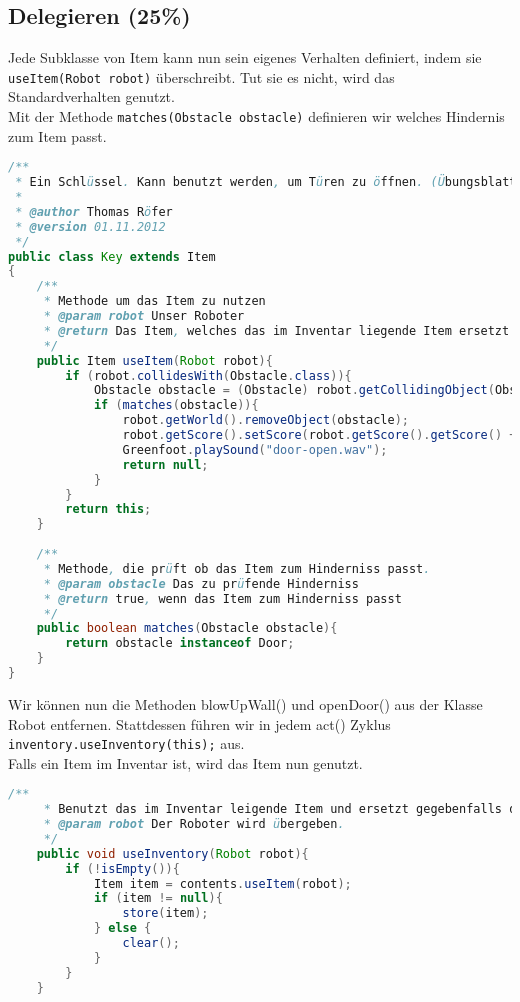 \documentclass{pi1}
\begin{document}
\subsection{Delegieren (25\%)}

Jede Subklasse von Item kann nun sein eigenes Verhalten definiert, indem sie \texttt{useItem(Robot robot)} überschreibt. Tut sie es nicht, wird das Standardverhalten genutzt.\\
Mit der Methode \texttt{matches(Obstacle obstacle)} definieren wir welches Hindernis zum Item passt.

\begin{lstlisting}[caption={Klasse \emph{Key}}, firstnumber=1, language=Java]
/**
 * Ein Schlüssel. Kann benutzt werden, um Türen zu öffnen. (Übungsblatt 3)
 * 
 * @author Thomas Röfer 
 * @version 01.11.2012
 */
public class Key extends Item
{
    /**
     * Methode um das Item zu nutzen
     * @param robot Unser Roboter
     * @return Das Item, welches das im Inventar liegende Item ersetzt
     */
    public Item useItem(Robot robot){
        if (robot.collidesWith(Obstacle.class)){
            Obstacle obstacle = (Obstacle) robot.getCollidingObject(Obstacle.class);
            if (matches(obstacle)){
                robot.getWorld().removeObject(obstacle);
                robot.getScore().setScore(robot.getScore().getScore() + 100);
                Greenfoot.playSound("door-open.wav");
                return null;
            }
        }
        return this;
    }
    
    /**
     * Methode, die prüft ob das Item zum Hinderniss passt.
     * @param obstacle Das zu prüfende Hinderniss
     * @return true, wenn das Item zum Hinderniss passt
     */
    public boolean matches(Obstacle obstacle){   
        return obstacle instanceof Door;
    }
}
\end{lstlisting}

Wir können nun die Methoden blowUpWall() und openDoor() aus der Klasse Robot entfernen. Stattdessen führen wir in jedem act() Zyklus \texttt{inventory.useInventory(this);} aus.
\\
Falls ein Item im Inventar ist, wird das Item nun genutzt.

\begin{lstlisting}[caption={Klasse \emph{Inventory}, Methode \emph{useInventory}}, firstnumber=67, language=Java]
/**
     * Benutzt das im Inventar leigende Item und ersetzt gegebenfalls das Item
     * @param robot Der Roboter wird übergeben.
     */
    public void useInventory(Robot robot){
        if (!isEmpty()){
            Item item = contents.useItem(robot);
            if (item != null){
                store(item);
            } else {
                clear();
            }
        }
    }
\end{lstlisting}
\end{document}
